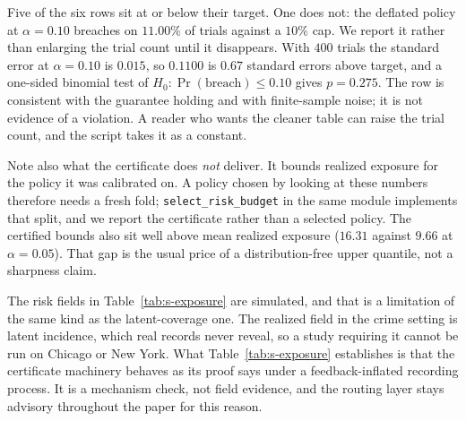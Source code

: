 \documentclass[journal,10pt,onecolumn]{IEEEtran}
\begin{document}
Five of the six rows sit at or below their target. One does not: the deflated
policy at $\alpha = 0.10$ breaches on $11.00\%$ of trials against a $10\%$ cap. We
report it rather than enlarging the trial count until it disappears. With $400$
trials the standard error at $\alpha = 0.10$ is $0.015$, so $0.1100$ is
$0.67$ standard errors above target, and a one-sided binomial test of
$H_0: \Pr(\text{breach}) \le 0.10$ gives $p = 0.275$. The row is consistent with
the guarantee holding and with finite-sample noise; it is not evidence of a
violation. A reader who wants the cleaner table can raise the trial count, and the
script takes it as a constant.

Note also what the certificate does \emph{not} deliver. It bounds realized
exposure for the policy it was calibrated on. A policy chosen by looking at these
numbers therefore needs a fresh fold; \texttt{select\_risk\_budget} in the same
module implements that split, and we report the certificate rather than a selected
policy. The certified bounds also sit well above mean realized exposure ($16.31$
against $9.66$ at $\alpha = 0.05$). That gap is the usual price of a
distribution-free upper quantile, not a sharpness claim.

The risk fields in Table~\ref{tab:s-exposure} are simulated, and that is a
limitation of the same kind as the latent-coverage one. The realized field in the
crime setting is latent incidence, which real records never reveal, so a study
requiring it cannot be run on Chicago or New York. What Table~\ref{tab:s-exposure}
establishes is that the certificate machinery behaves as its proof says under a
feedback-inflated recording process. It is a mechanism check, not field evidence,
and the routing layer stays advisory throughout the paper for this reason.
\end{document}
